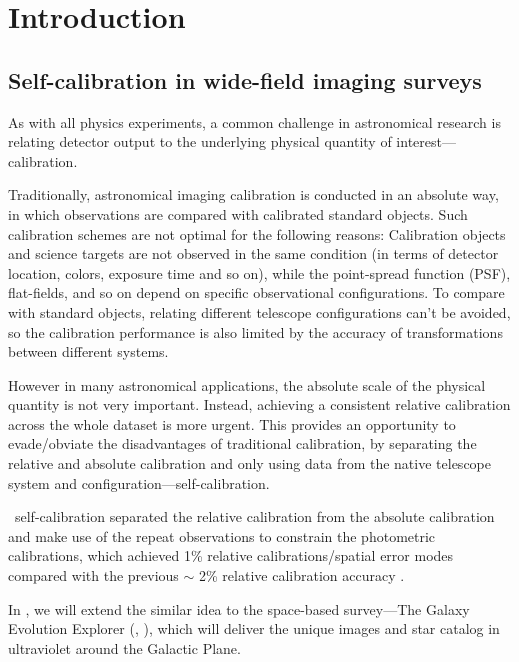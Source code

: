 \chapter*{Introduction}

\newcommand{\pdc}{\project{PDC}}


\section{Self-calibration in wide-field imaging surveys}
As with all physics experiments, a common challenge in astronomical research is relating detector output to the underlying physical quantity of interest---calibration.

Traditionally, astronomical imaging calibration is conducted in an absolute way, in which observations are compared with calibrated standard objects.
Such calibration schemes are not optimal for the following reasons:
Calibration objects and science targets are not observed in the same condition (in terms of detector location, colors, exposure time and so on), while the point-spread function (PSF), flat-fields, and so on depend on specific observational configurations.
To compare with standard objects, relating different telescope configurations can't be avoided, so the calibration performance is also limited by the accuracy of transformations between different systems.

However in many astronomical applications,  the absolute scale of the physical quantity is not very important.
Instead, achieving a consistent relative calibration across the whole dataset is more urgent.
This provides an opportunity to evade/obviate the disadvantages of traditional calibration, by separating the relative and absolute calibration and only using data from the native telescope system and configuration---self-calibration.

\sdss\ self-calibration \citep{uber} separated the relative calibration from the absolute calibration and make use of the repeat observations to constrain the photometric calibrations, which achieved 1\% relative calibrations/spatial error modes compared with the  previous $\sim$ 2\% relative calibration accuracy \citep{sdss2}.

In , we will extend the similar idea to the space-based survey---The Galaxy Evolution Explorer (\galex, \citealt{galex1}), which will deliver the unique images and star catalog in ultraviolet around the Galactic Plane. 

